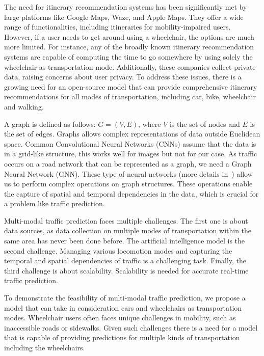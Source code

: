 The need for itinerary recommendation systems has been significantly met by large platforms like Google Maps, Waze, and Apple Maps.
They offer a wide range of functionalities, including itineraries for mobility-impaired users.
However, if a user needs to get around using a wheelchair, the options are much more limited.
For instance, any of the broadly known itinerary recommendation systems are capable of computing the time to go somewhere by using solely the wheelchair as transportation mode.
Additionally, these companies collect private data, raising concerns about user privacy.
To address these issues, there is a growing need for an open-source model that can provide comprehensive itinerary
    recommendations for all modes of transportation, including car, bike, wheelchair and walking.
\vspace{1em}

A graph is defined as follows: $G = (V, E)$, where $V$ is the set of nodes and $E$ is the set of edges.
Graphs allows complex representations of data outside Euclidean space.
Common Convolutional Neural Networks (CNNs) assume that the data is in a grid-like structure, this works well for images but not for our case.
As traffic occurs on a road network that can be represented as a graph, we need a Graph Neural Network (GNN).
These type of neural networks (more details in~\cite{Wu2019A}) allow us to perform complex operations on graph structures.
These operations enable the capture of spatial and temporal dependencies in the data, which is crucial for a problem like traffic prediction.
\vspace{1em}

Multi-modal traffic prediction faces multiple challenges.
The first one is about data sources, as data collection on multiple modes of transportation within the same area has never been done before.
The artificial intelligence model is the second challenge.
Managing various locomotion modes and capturing the temporal and spatial dependencies of traffic is a challenging task.
Finally, the third challenge is about scalability.
Scalability is needed for accurate real-time traffic prediction.
\vspace{1em}

To demonstrate the feasibility of multi-modal traffic prediction, we propose a model that can take in consideration cars and wheelchairs as transportation modes.
Wheelchair users often faces unique challenges in mobility, such as inaccessible roads or sidewalks.
Given such challenges there is a need for a model that is capable of providing predictions for multiple kinds of transportation including the wheelchairs.
\vspace{1em}

